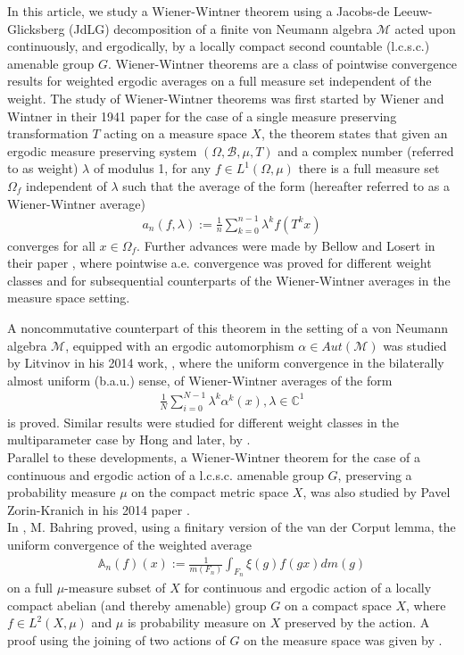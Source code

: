 \documentclass[11pt]{amsart}
\theoremstyle{definition}
\theoremstyle{myremark}
\numberwithin{equation}{section}
\def\A{\mathbb A}
\def\C{\mathbb C}
\newcommand{\CM}{\mathcal{M}}
\begin{document}
In this article, we study a Wiener-Wintner theorem using a Jacobs-de Leeuw-Glicksberg   (JdLG) decomposition of a finite von Neumann algebra $\CM$ acted upon continuously, and ergodically, by a locally compact second countable (l.c.s.c.) amenable group $G$. Wiener-Wintner theorems are a class of pointwise convergence results for weighted ergodic averages on a full measure set independent of the weight. The study of Wiener-Wintner theorems was first started by Wiener and Wintner in their 1941 paper \cite{classicalZWW} for the case of a single measure preserving transformation $T$ acting on a measure space $X$,  the theorem states that given an ergodic measure preserving system $(\Omega,\mathcal{B},\mu,T)$ and a complex number (referred to as weight) $\lambda$ of modulus 1, for any $f\in L^1(\Omega,\mu)$ there is a full measure set $\Omega_f$ independent of $\lambda$ such that the average of the form (hereafter referred to as a Wiener-Wintner average)
\begin{align*}a_n(f,\lambda):=\frac{1}{n}\displaystyle\sum_{k=0}^{n-1}\lambda^kf(T^kx)
\end{align*}
converges for all $x\in \Omega_f$. Further advances were made by Bellow and Losert in their paper \cite{BellowLosert}, where pointwise a.e. convergence was proved for different weight classes and for subsequential counterparts of the Wiener-Wintner averages in the measure space setting.

\noindent A noncommutative counterpart of this theorem in the setting of a von Neumann algebra $\CM$, equipped with an ergodic automorphism $\alpha \in Aut(\CM)$ was studied by Litvinov in his 2014 work, \cite{Lit2014}, where the uniform convergence in the bilaterally almost uniform (b.a.u.) sense, of Wiener-Wintner averages of the form
\begin{align*}
    \frac{1}{N}\sum_{i=0}^{N-1}\lambda^{k}\alpha^{k}(x), \lambda \in \C^{1}
\end{align*}
is proved. Similar results were studied for different weight classes in the multiparameter case by Hong \cite{Hong-Sun-2018} and later, by \cite{OBrien2021NoncommutativeWT}.\\
Parallel to these developments, a Wiener-Wintner theorem for the case of a continuous and ergodic action of a l.c.s.c. amenable group $G$, preserving a probability measure $\mu$ on the compact metric space $X$, was also studied by Pavel Zorin-Kranich in his 2014 paper \cite{Pavel}.\\ 
In \cite{Bahring2019},  M. Bahring  proved, using a finitary version of the van der Corput lemma, the uniform convergence of the weighted average 
\begin{align*}
    \A_n(f)(x):=\frac{1}{m(F_n)}\int_{F_n}\xi(g)f(gx)dm(g)
\end{align*}
on a full $\mu$-measure subset of $X$
for continuous and ergodic action of a locally compact abelian (and thereby amenable) group $G$ on a compact space $X$, where $f\in L^2(X,\mu)$ and $\mu$ is probability measure on $X$ preserved by the action. A proof using the joining of two actions of $G$ on the measure space was given by \cite{ElAbdalaoui2021}. \\
\end{document}
